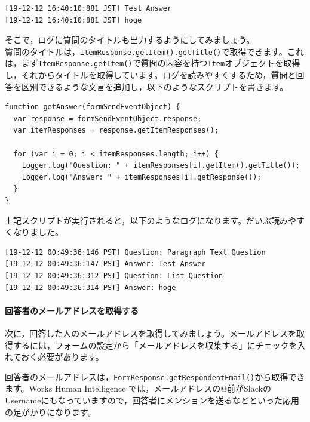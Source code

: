 \documentclass[uplatex,a4j]{jsarticle}
\begin{document}
\begin{lstlisting}[basicstyle=\ttfamily\footnotesize,frame=single,caption=Event Object output example 2]
[19-12-12 16:40:10:881 JST] Test Answer
[19-12-12 16:40:10:881 JST] hoge
\end{lstlisting}

そこで，ログに質問のタイトルも出力するようにしてみましょう。\\質問のタイトルは，\verb|ItemResponse.getItem().getTitle()|で取得できます。これは，まず\verb|ItemResponse.getItem()|で質問の内容を持つ\verb|Item|オブジェクトを取得し，それからタイトルを取得しています。ログを読みやすくするため，質問と回答を区別できるような文言を追加し，以下のようなスクリプトを書きます。

\begin{lstlisting}[basicstyle=\ttfamily\footnotesize,frame=single,caption=Event Object sample 4]
function getAnswer(formSendEventObject) {
  var response = formSendEventObject.response;
  var itemResponses = response.getItemResponses();
  
  for (var i = 0; i < itemResponses.length; i++) {
    Logger.log("Question: " + itemResponses[i].getItem().getTitle());
    Logger.log("Answer: " + itemResponses[i].getResponse());
  }
}
\end{lstlisting}

上記スクリプトが実行されると，以下のようなログになります。だいぶ読みやすくなりました。

\begin{lstlisting}[basicstyle=\ttfamily\footnotesize,frame=single,caption=Event Object output example 3]
[19-12-12 00:49:36:146 PST] Question: Paragraph Text Question
[19-12-12 00:49:36:147 PST] Answer: Test Answer
[19-12-12 00:49:36:312 PST] Question: List Question
[19-12-12 00:49:36:314 PST] Answer: hoge
\end{lstlisting}

\paragraph{回答者のメールアドレスを取得する}

次に，回答した人のメールアドレスを取得してみましょう。メールアドレスを取得するには，フォームの設定から「メールアドレスを収集する」にチェックを入れておく必要があります。


回答者のメールアドレスは，\verb|FormResponse.getRespondentEmail()|から取得できます。Works Human Intelligence では，メールアドレスの@前がSlackのUsernameにもなっていますので，回答者にメンションを送るなどといった応用の足がかりになります。
\end{document}
